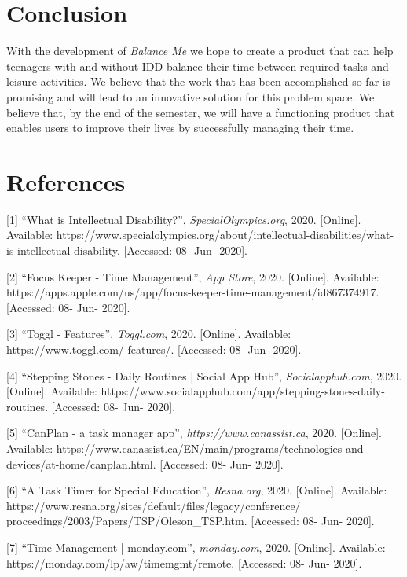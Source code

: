 \documentclass{sigchi}
\begin{document}
\section{Conclusion}

With the development of \textit{Balance Me} we hope to create a product that
can help teenagers with and without IDD balance their time between required
tasks and leisure activities. We believe that the work that has been
accomplished so far is promising and will lead to an innovative solution for
this problem space. We believe that, by the end of the semester, we will have a
functioning product that enables users to improve their lives by successfully
managing their time.

\section{References}
[1] ``What is Intellectual Disability?'', \textit{SpecialOlympics.org}, 2020. [Online]. Available: https://www.specialolympics.org/about/intellectual-disabilities/what-is-intellectual-disability. [Accessed: 08- Jun- 2020].

[2] ``Focus Keeper - Time Management'', \textit{App Store}, 2020. [Online]. Available: https://apps.apple.com/us/app/focus-keeper-time-management/id867374917. [Accessed: 08- Jun- 2020].

[3] ``Toggl - Features'', \textit{Toggl.com}, 2020. [Online]. Available: https://www.toggl.com/
features/. [Accessed: 08- Jun- 2020].

[4] ``Stepping Stones - Daily Routines | Social App Hub'', \textit{Socialapphub.com}, 2020. [Online]. Available: https://www.socialapphub.com/app/stepping-stones-daily-routines. [Accessed: 08- Jun- 2020].

[5] ``CanPlan - a task manager app'', \textit{https://www.canassist.ca}, 2020. [Online]. Available: https://www.canassist.ca/EN/main/programs/technologies-and-devices/at-home/canplan.html. [Accessed: 08- Jun- 2020].

[6] ``A Task Timer for Special Education'', \textit{Resna.org}, 2020. [Online]. Available: https://www.resna.org/sites/default/files/legacy/conference/
proceedings/2003/Papers/TSP/Oleson\_TSP.htm. [Accessed: 08- Jun- 2020].

[7] ``Time Management | monday.com'', \textit{monday.com}, 2020. [Online]. Available: https://monday.com/lp/aw/timemgmt/remote. [Accessed: 08- Jun- 2020].
\end{document}
